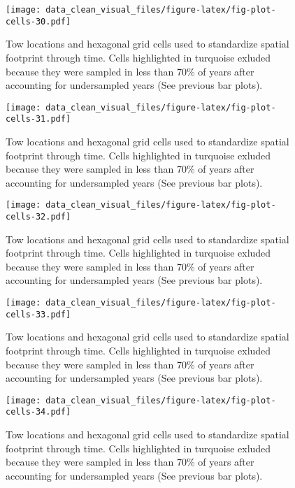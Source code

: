 \documentclass[
]{article}
\begin{document}
\begin{figure}
\centering
\texttt{[image: data\_clean\_visual\_files/figure-latex/fig-plot-cells-30.pdf]}
\caption{\label{fig:fig-plot-cells-30}Tow locations and hexagonal grid cells used to standardize spatial footprint through time. Cells highlighted in turquoise exluded because they were sampled in less than 70\% of years after accounting for undersampled years (See previous bar plots).}
\end{figure}

\begin{figure}
\centering
\texttt{[image: data\_clean\_visual\_files/figure-latex/fig-plot-cells-31.pdf]}
\caption{\label{fig:fig-plot-cells-31}Tow locations and hexagonal grid cells used to standardize spatial footprint through time. Cells highlighted in turquoise exluded because they were sampled in less than 70\% of years after accounting for undersampled years (See previous bar plots).}
\end{figure}

\begin{figure}
\centering
\texttt{[image: data\_clean\_visual\_files/figure-latex/fig-plot-cells-32.pdf]}
\caption{\label{fig:fig-plot-cells-32}Tow locations and hexagonal grid cells used to standardize spatial footprint through time. Cells highlighted in turquoise exluded because they were sampled in less than 70\% of years after accounting for undersampled years (See previous bar plots).}
\end{figure}

\begin{figure}
\centering
\texttt{[image: data\_clean\_visual\_files/figure-latex/fig-plot-cells-33.pdf]}
\caption{\label{fig:fig-plot-cells-33}Tow locations and hexagonal grid cells used to standardize spatial footprint through time. Cells highlighted in turquoise exluded because they were sampled in less than 70\% of years after accounting for undersampled years (See previous bar plots).}
\end{figure}

\begin{figure}
\centering
\texttt{[image: data\_clean\_visual\_files/figure-latex/fig-plot-cells-34.pdf]}
\caption{\label{fig:fig-plot-cells-34}Tow locations and hexagonal grid cells used to standardize spatial footprint through time. Cells highlighted in turquoise exluded because they were sampled in less than 70\% of years after accounting for undersampled years (See previous bar plots).}
\end{figure}
\end{document}

